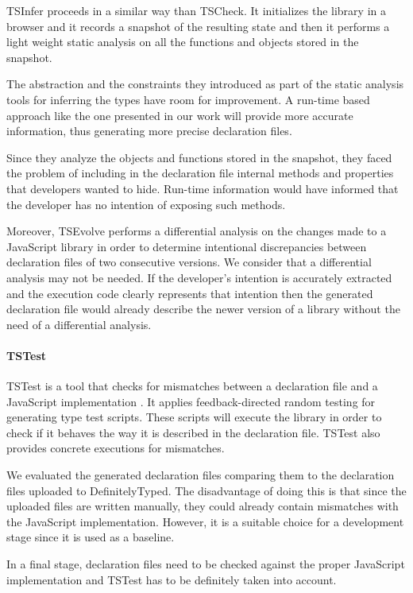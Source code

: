 \documentclass[a4paper,english,cleveref, autoref]{lipics-v2019}
\begin{document}
TSInfer proceeds in a similar way than TSCheck. It initializes the library in a browser and it records a snapshot of the resulting state and then it performs a light weight static analysis on all the functions and objects stored in the snapshot.

The abstraction and the constraints they introduced as part of the static analysis tools for inferring the types have room for improvement. A run-time based approach like the one presented in our work will provide more accurate information, thus generating more precise declaration files.

Since they analyze the objects and functions stored in the snapshot, they faced the problem of including in the declaration file internal methods and properties that developers wanted to hide. Run-time information would have informed that the developer has no intention of exposing such methods.

Moreover, TSEvolve performs a differential analysis on the changes made to a JavaScript library in order to determine intentional discrepancies between declaration files of two consecutive versions. We consider that a differential analysis may not be needed. If the developer's intention is accurately extracted and the execution code clearly represents that intention then the generated declaration file would already describe the newer version of a library without the need of a differential analysis.

\paragraph*{TSTest}
TSTest is a tool that checks for mismatches between a declaration file and a JavaScript implementation \cite{DBLP:journals/pacmpl/KristensenM17}. It applies feedback-directed random testing for generating type test scripts. These scripts will execute the library in order to check if it behaves the way it is described in the declaration file. TSTest also provides concrete executions for mismatches.

We evaluated the generated declaration files comparing them to the declaration files uploaded to DefinitelyTyped. The disadvantage of doing this is that since the uploaded files are written manually, they could already contain mismatches with the JavaScript implementation. However, it is a suitable choice for a development stage since it is used as a baseline.

In a final stage, declaration files need to be checked against the proper JavaScript implementation and TSTest has to be definitely taken into account.
\end{document}
